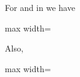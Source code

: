 \documentclass[11pt,oneside]{article}
\begin{document}
\begin{BookBody}
 For  and  in  we have

\begin{center}\begin{adjustbox}{max width=\linewidth}\end{adjustbox}\end{center}

\noindent Also,

\begin{center}\begin{adjustbox}{max width=\linewidth}\end{adjustbox}\end{center}

\end{BookBody}

\BookNarrativetrue
\end{document}
